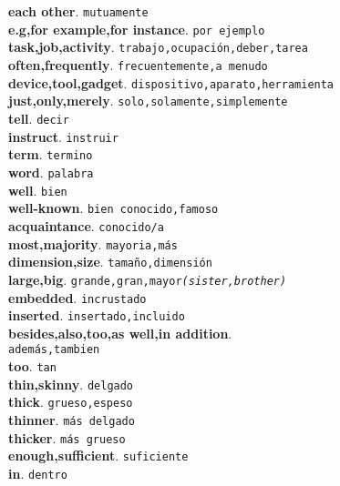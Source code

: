\documentclass[twocolumn]{article}
\begin{document}
	\textsf{\textbf{each other}}. \texttt{mutuamente}\\
	\textsf{\textbf{e.g,for example,for instance}}. \texttt{por ejemplo}\\
	\textsf{\textbf{task,job,activity}}. \texttt{trabajo,ocupaci\'on,deber,tarea}\\
	\textsf{\textbf{often,frequently}}. \texttt{frecuentemente,a menudo}\\
	\textsf{\textbf{device,tool,gadget}}. \texttt{dispositivo,aparato,herramienta}\\
	\textsf{\textbf{just,only,merely}}. \texttt{solo,solamente,simplemente}\\
	\textsf{\textbf{tell}}. \texttt{decir}\\
	\textsf{\textbf{instruct}}. \texttt{instruir}\\
	\textsf{\textbf{term}}. \texttt{termino}\\
	\textsf{\textbf{word}}. \texttt{palabra}\\
	\textsf{\textbf{well}}. \texttt{bien}\\
	\textsf{\textbf{well-known}}. \texttt{bien conocido,famoso}\\
	\textsf{\textbf{acquaintance}}. \texttt{conocido/a}\\
	\textsf{\textbf{most,majority}}. \texttt{mayoria,m\'as}\\
	\textsf{\textbf{dimension,size}}. \texttt{tama\~no,dimensi\'on}\\
	\textsf{\textbf{large,big}}. \texttt{grande,gran,mayor{\scriptsize \textsl{(sister,brother)}}}\\
	\textsf{\textbf{embedded}}. \texttt{incrustado}\\
	\textsf{\textbf{inserted}}. \texttt{insertado,incluido}\\
	\textsf{\textbf{besides,also,too,as well,in addition}}.\\\texttt{adem\'as,tambien}\\
	\textsf{\textbf{too}}. \texttt{tan}\\
	\textsf{\textbf{thin,skinny}}. \texttt{delgado}\\
	\textsf{\textbf{thick}}. \texttt{grueso,espeso}\\
	\textsf{\textbf{thinner}}. \texttt{m\'as delgado}\\
	\textsf{\textbf{thicker}}. \texttt{m\'as grueso}\\
	\textsf{\textbf{enough,sufficient}}. \texttt{suficiente}\\
	\textsf{\textbf{in}}. \texttt{dentro}\\
\end{document}
